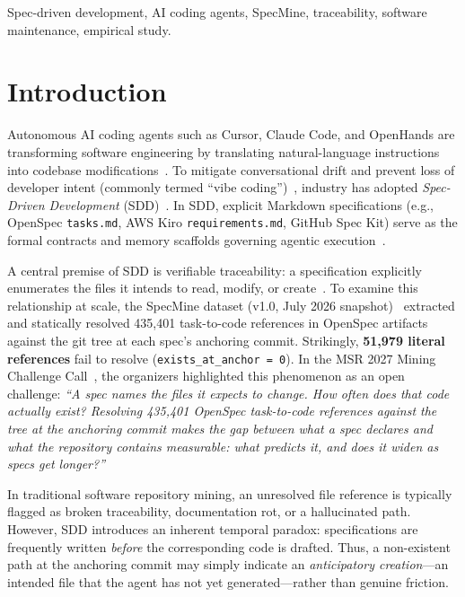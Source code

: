 \documentclass[10pt,conference]{IEEEtran}
\begin{document}
\begin{IEEEkeywords}
Spec-driven development, AI coding agents, SpecMine, traceability, software maintenance, empirical study.
\end{IEEEkeywords}

\section{Introduction}

Autonomous AI coding agents such as Cursor, Claude Code, and OpenHands are transforming software engineering by translating natural-language instructions into codebase modifications~\cite{meske2025, abrahao2025}. To mitigate conversational drift and prevent loss of developer intent (commonly termed ``vibe coding'')~\cite{meske2025}, industry has adopted \textit{Spec-Driven Development} (SDD)~\cite{diaz2026, specmine2027}. In SDD, explicit Markdown specifications (e.g., OpenSpec \texttt{tasks.md}, AWS Kiro \texttt{requirements.md}, GitHub Spec Kit) serve as the formal contracts and memory scaffolds governing agentic execution~\cite{specmine2027}.

A central premise of SDD is verifiable traceability: a specification explicitly enumerates the files it intends to read, modify, or create~\cite{gotel1994, storey2026}. To examine this relationship at scale, the SpecMine dataset (v1.0, July 2026 snapshot)~\cite{specmine2027} extracted and statically resolved 435,401 task-to-code references in OpenSpec artifacts against the git tree at each spec's anchoring commit. Strikingly, \textbf{51,979 literal references} fail to resolve (\texttt{exists\_at\_anchor = 0}). In the MSR 2027 Mining Challenge Call~\cite{specmine2027}, the organizers highlighted this phenomenon as an open challenge: \textit{``A spec names the files it expects to change. How often does that code actually exist? Resolving 435,401 OpenSpec task-to-code references against the tree at the anchoring commit makes the gap between what a spec declares and what the repository contains measurable: what predicts it, and does it widen as specs get longer?''}

In traditional software repository mining, an unresolved file reference is typically flagged as broken traceability, documentation rot, or a hallucinated path. However, SDD introduces an inherent temporal paradox: specifications are frequently written \textit{before} the corresponding code is drafted. Thus, a non-existent path at the anchoring commit may simply indicate an \textit{anticipatory creation}---an intended file that the agent has not yet generated---rather than genuine friction.
\end{document}
